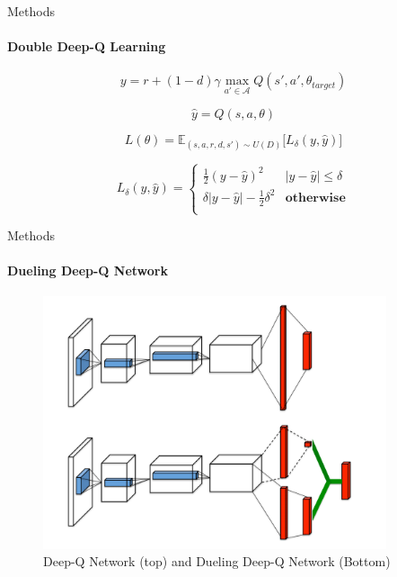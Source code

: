\documentclass{beamer}
\begin{document}
\begin{frame}{Methods}
\framesubtitle{Double Deep-Q Learning}

\begin{equation}
y = r + (1 - d) \gamma \max_{a' \in \mathcal{A}} Q(s', a', \theta_{target})
\end{equation}

\begin{equation}
\hat{y} = Q(s, a, \theta)
\end{equation}

\begin{equation}
L(\theta) =
\mathbb{E}_{(s, a, r, d, s') \sim U(D)} \bigg[ L_{\delta}(y, \hat{y}) \bigg]
\label{eqn:deep-q-alg}
\end{equation}

\begin{equation}
L_{\delta}(y, \hat{y}) = \begin{cases}
      \frac{1}{2} (y - \hat{y})^2                & |y - \hat{y}| \leq \delta \\
      \delta |y - \hat{y}| - \frac{1}{2}\delta^2 & \textbf{otherwise} \\
\end{cases}
\label{eqn:huber}
\end{equation}

\end{frame}



\begin{frame}{Methods}
\framesubtitle{Dueling Deep-Q Network}
\begin{figure}
\includegraphics[width=0.9\textwidth]{img/dueling-deep-q}
\caption*{Deep-Q Network (top) and Dueling Deep-Q Network (Bottom)}
\end{figure}
\end{frame}
\end{document}
